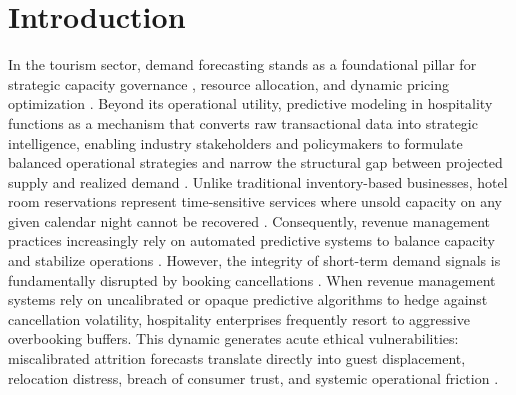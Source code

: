 \documentclass[pdflatex,iicol,sn-mathphys-ay]{sn-jnl}
\theoremstyle{thmstyleone}%
\theoremstyle{thmstyletwo}%
\theoremstyle{thmstylethree}%
\begin{document}

\maketitle

\section{Introduction}
\label{sec:introduction}

In the tourism sector, demand forecasting stands as a foundational pillar for strategic capacity governance \citep{antonio2017predicting}, resource allocation, and dynamic pricing optimization \citep{ampountolas2025predicting}. Beyond its operational utility, predictive modeling in hospitality functions as a mechanism that converts raw transactional data into strategic intelligence, enabling industry stakeholders and policymakers to formulate balanced operational strategies and narrow the structural gap between projected supply and realized demand \citep{herrera2024machine}. Unlike traditional inventory-based businesses, hotel room reservations represent time-sensitive services where unsold capacity on any given calendar night cannot be recovered \citep{antonio2019big, mir2026decoding}. Consequently, revenue management practices increasingly rely on automated predictive systems to balance capacity and stabilize operations \citep{liu2025explainable, yoo2024predicting}. However, the integrity of short-term demand signals is fundamentally disrupted by booking cancellations \citep{liu2023hospitality, luo2025hotel}. When revenue management systems rely on uncalibrated or opaque predictive algorithms to hedge against cancellation volatility, hospitality enterprises frequently resort to aggressive overbooking buffers. This dynamic generates acute ethical vulnerabilities: miscalibrated attrition forecasts translate directly into guest displacement, relocation distress, breach of consumer trust, and systemic operational friction \citep{lin2026developing, sierag2015revenue}.
\end{document}
